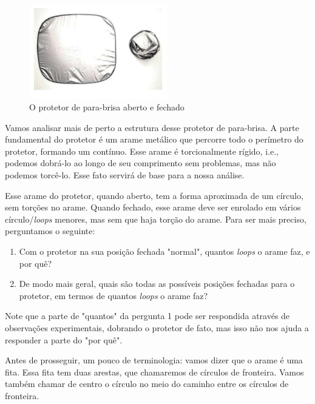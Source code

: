 	\begin{figure}[H]
		\begin{center}
			\includegraphics[width=6cm]{Images/protetor_solar.png}
		\end{center}\caption{O protetor de para-brisa aberto e fechado}\label{protetor solar}
	\end{figure}
	\par\vspace{0.3cm} Vamos analisar mais de perto a estrutura desse protetor de para-brisa. A parte fundamental do protetor é um arame metálico que percorre todo o perímetro do protetor, formando um  contínuo. Esse arame é torcionalmente rígido, i.e., podemos dobrá-lo ao longo de seu comprimento sem problemas, mas não podemos torcê-lo. Esse fato servirá de base para a nossa análise.
	\par\vspace{0.3cm} Esse arame do protetor, quando aberto, tem a forma aproximada de um círculo, sem torções no arame. Quando fechado, esse arame deve ser enrolado em vários círculo/\textit{loops} menores, mas sem que haja torção do arame. Para ser mais preciso, perguntamos o seguinte:
	\begin{enumerate}
		\item Com o protetor na sua posição fechada "normal", quantos \textit{loops} o arame faz, e por quê?
		\item De modo mais geral, quais são todas as possíveis posições fechadas para o protetor, em termos de quantos \textit{loops} o arame faz? 
	\end{enumerate} 
	\par\vspace{0.3cm} Note que a parte de "quantos" da pergunta 1 pode ser respondida através de observações experimentais, dobrando o protetor de fato, mas isso não nos ajuda a responder a parte do "por quê".
	\par\vspace{0.3cm} Antes de prosseguir, um pouco de terminologia: vamos dizer que o arame é uma fita. Essa fita tem duas arestas, que chamaremos de círculos de fronteira. Vamos também chamar de centro o círculo no meio do caminho entre os círculos de fronteira. 
